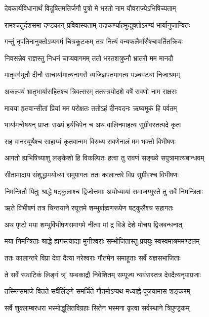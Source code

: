 \twolineshloka
{देवकार्यविधानार्थं विदूषितमतिर्जगौ}
{पुत्रो मे भरतो नाम यौवराज्येऽभिषिच्यताम्}%

\twolineshloka
{रामश्चतुर्दशसमा दण्डकान् प्रविवास्यताम्}
{तदाकर्ण्याहमुद्युक्तोऽरण्यं भार्यानुजान्वितः}%

\twolineshloka
{गन्तुं नृपतिनानुक्तोऽप्यगमं चित्रकूटकम्}
{तत्र नित्यं वन्यफलैर्मांसैश्चावर्तितक्रियः}%

\twolineshloka
{निवसन्नेव राज्ञस्तु निधनं चाप्यवागमम्}
{ततो भरतशत्रुघ्नौ भ्रातरौ मम मानदौ}%

\twolineshloka
{मातृवर्गयुतौ दीनौ साचार्यामात्यनागरौ}
{व्यजिज्ञपतमागत्य पञ्चवट्यां निजाश्रमम्}%

\twolineshloka
{अकल्पयं भ्रातृभार्यासहितश्च त्रिवत्सरम्}
{ततस्त्रयोदशे वर्षे रावणो नाम राक्षसः}%

\twolineshloka
{मायया हृतवान्सीतां प्रियां मम परोक्षतः}
{ततोऽहं दीनवदनः ऋष्यमूकं हि पर्वतम्}%

\twolineshloka
{भार्यामन्वेषयन् प्राप्तः सख्यं हर्यधिपेन च}
{अथ वालिनमाहत्य सुग्रीवस्तत्पदे कृतः}%

\twolineshloka
{सह वानरयूथैश्च साहाय्यं कृतवान्मम}
{विरुध्य रावणेनालं मम भक्तो विभीषणः}%

\twolineshloka
{आगतो ह्यभिषिच्याशु लङ्केशो हि विकल्पितः}
{हत्वा तु रावणं सङ्ख्ये सपुत्रामात्यबान्धवम्}%

\twolineshloka
{सीतामादाय संशुद्धामयोध्यां समुपागतः}
{ततः कालान्तरे विप्र सुग्रीवश्च विभीषणः}%

\twolineshloka
{निमन्त्रितौ पितुः श्राद्धे षट्कुलाश्च द्विजोत्तमाः}
{अयोध्यायां समाजग्मुस्ते तु सर्वे निमन्त्रिताः}%

\twolineshloka
{ऋते विभीषणं तत्र चिन्तयाने रघूत्तमे}
{शम्भुर्बाह्मणरूपेण षट्कुलैश्च सहागतः}%

\twolineshloka
{अथ पृष्टो मया शम्भुर्विभीषणसमागमे}
{नीत्वा मां द्र विडे देशे मोचय द्विजबन्धनात्}%

\twolineshloka
{मया निमन्त्रिताः श्राद्धे ह्यगस्त्याद्या मुनीश्वराः}
{सम्भोजितास्तु प्रययुः स्वस्वमाश्रममण्डलम्}%

\twolineshloka
{ततः कालान्तरे विप्रा देवा दैत्या नरेश्वराः}
{गौतमेन समाहूताः सर्वे यज्ञसभाजिताः}%

\twolineshloka
{ते सर्वे स्फाटिकं लिङ्गं त्र्! यम्बकाद्रौ निवेशितम्}
{सम्पूज्य न्यवंसस्तत्र देवदैत्यनृपाग्रजाः}%

\twolineshloka
{तस्मिन्समाजे वितते सर्वैर्लिङ्गे समर्चिते}
{गौतमोऽप्यथ मध्याह्ने पूजयामास शङ्करम्}%

\twolineshloka
{सर्वे शुक्लाम्बरधरा भस्मोद्धूलितविग्रहाः}
{सितेन भस्मना कृत्वा सर्वस्थाने त्रिपुण्ड्रकम्}%

